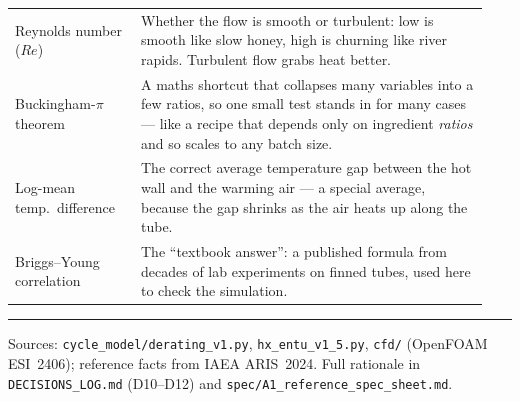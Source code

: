 \documentclass[11pt]{article}
\begin{document}
{\begin{tabular}{@{}p{0.25\linewidth}p{0.69\linewidth}@{}}
Reynolds number ($Re$) & Whether the flow is smooth or turbulent: low is smooth like slow honey, high is churning like river rapids. Turbulent flow grabs heat better.\\
Buckingham-$\pi$ theorem & A maths shortcut that collapses many variables into a few ratios, so one small test stands in for many cases --- like a recipe that depends only on ingredient \emph{ratios} and so scales to any batch size.\\
Log-mean temp.\ difference & The correct average temperature gap between the hot wall and the warming air --- a special average, because the gap shrinks as the air heats up along the tube.\\
Briggs--Young correlation & The ``textbook answer'': a published formula from decades of lab experiments on finned tubes, used here to check the simulation.\\
\bottomrule
\end{tabular}\par}

\vspace{2pt}\noindent\rule{\linewidth}{0.4pt}
{\footnotesize\noindent Sources: \texttt{cycle\_model/derating\_v1.py}, \texttt{hx\_entu\_v1\_5.py},
\texttt{cfd/} (OpenFOAM ESI~2406); reference facts from IAEA ARIS~2024. Full rationale in
\texttt{DECISIONS\_LOG.md} (D10--D12) and \texttt{spec/A1\_reference\_spec\_sheet.md}.}
\end{document}

